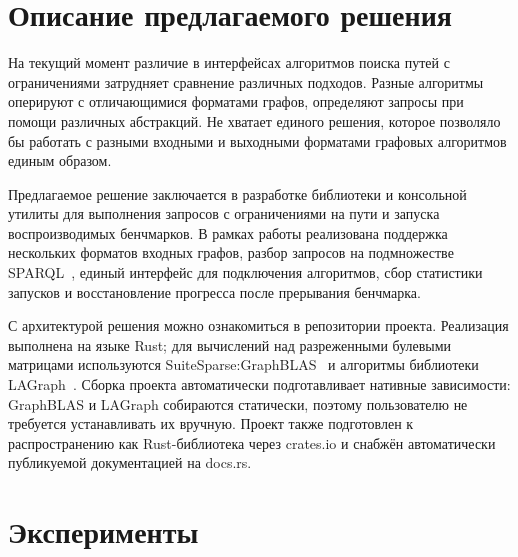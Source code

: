 \documentclass[a4paper]{article}
\begin{document}
\section{Описание предлагаемого решения}

На текущий момент различие в интерфейсах алгоритмов поиска путей с ограничениями затрудняет сравнение различных подходов.
Разные алгоритмы оперируют с отличающимися форматами графов, определяют запросы при помощи различных абстракций.
Не хватает единого решения, которое позволяло бы работать с разными входными и выходными форматами графовых алгоритмов единым образом.

Предлагаемое решение заключается в разработке библиотеки и консольной утилиты для выполнения запросов с ограничениями на пути и запуска воспроизводимых бенчмарков.
В рамках работы реализована поддержка нескольких форматов входных графов, разбор запросов на подмножестве SPARQL~\cite{sparql11-query},
единый интерфейс для подключения алгоритмов, сбор статистики запусков и восстановление прогресса после прерывания бенчмарка.

С архитектурой решения можно ознакомиться в репозитории проекта.
Реализация выполнена на языке Rust; для вычислений над разреженными булевыми матрицами используются SuiteSparse:GraphBLAS~\cite{graphblas} и алгоритмы библиотеки LAGraph~\cite{lagraph}.
Сборка проекта автоматически подготавливает нативные зависимости: GraphBLAS и LAGraph собираются статически, поэтому пользователю не требуется устанавливать их вручную.
Проект также подготовлен к распространению как Rust-библиотека через crates.io и снабжён автоматически публикуемой документацией на docs.rs.


\section{Эксперименты}

\end{document}
